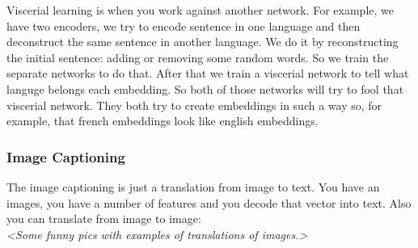Viscerial learning is when you work against another network. For example, we have two encoders, we try to encode sentence in one language and then deconstruct the same sentence in another language. We do it by reconstructing the initial sentence: adding or removing some random words. So we train the separate networks to do that. After that we train a viscerial network to tell what languge belongs each embedding. So both of those networks will try to fool that viscerial network. They both try to create embeddings in such a way so, for example, that french embeddings look like english embeddings.

\subsubsection*{Image Captioning}

The image captioning is just a translation from image to text. You have an images, you have a number of features and you decode that vector into text. Also you can translate from image to image:\\
{\it <Some funny pics with examples of translations of images.>}